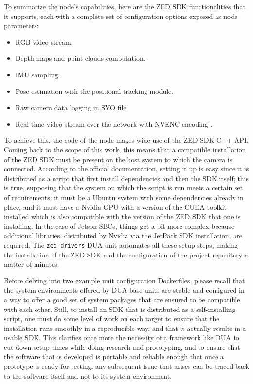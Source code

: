 To summarize the node's capabilities, here are the ZED SDK functionalities that it supports, each with a complete set of configuration options exposed as node parameters:
\begin{itemize}
  \item RGB video stream.
  \item Depth maps and point clouds computation.
  \item IMU sampling.
  \item Pose estimation with the positional tracking module.
  \item Raw camera data logging in SVO file.
  \item Real-time video stream over the network with NVENC encoding \cite{nvidia_nvidia_nodate-1}.
\end{itemize}
To achieve this, the code of the node makes wide use of the ZED SDK C++ API. Coming back to the scope of this work, this means that a compatible installation of the ZED SDK must be present on the host system to which the camera is connected. According to the official documentation, setting it up is easy since it is distributed as a script that first install dependencies and then the SDK itself; this is true, supposing that the system on which the script is run meets a certain set of requirements: it must be a Ubuntu \cite{canonical_ubuntu_nodate} system with some dependencies already in place, and it must have a Nvidia GPU with a version of the CUDA toolkit \cite{nvidia_cuda_nodate-1} installed which is also compatible with the version of the ZED SDK that one is installing. In the case of Jetson SBCs, things get a bit more complex because additional libraries, distributed by Nvidia via the JetPack SDK installation, are required. The \texttt{zed\_drivers} DUA unit automates all these setup steps, making the installation of the ZED SDK and the configuration of the project repository a matter of minutes.

Before delving into two example unit configuration Dockerfiles, please recall that the system environments offered by DUA base units are stable and configured in a way to offer a good set of system packages that are ensured to be compatible with each other. Still, to install an SDK that is distributed as a self-installing script, one must do some level of work on each target to ensure that the installation runs smoothly in a reproducible way, and that it actually results in a usable SDK. This clarifies once more the necessity of a framework like DUA to cut down setup times while doing research and prototyping, and to ensure that the software that is developed is portable and reliable enough that once a prototype is ready for testing, any subsequent issue that arises can be traced back to the software itself and not to its system environment.

